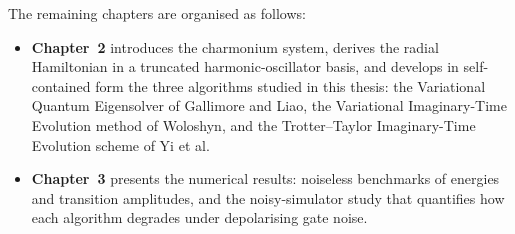 The remaining chapters are organised as follows:
\begin{itemize}
  \item \textbf{Chapter~2} introduces the charmonium system, derives the
    radial Hamiltonian in a truncated harmonic-oscillator basis, and
    develops in self-contained form the three algorithms studied in this
    thesis: the Variational Quantum Eigensolver of Gallimore and Liao,
    the Variational Imaginary-Time Evolution method of Woloshyn, and the
    Trotter--Taylor Imaginary-Time Evolution scheme of Yi et al.
  \item \textbf{Chapter~3} presents the numerical results: noiseless
    benchmarks of energies and transition amplitudes, and the
    noisy-simulator study that quantifies how each algorithm degrades
    under depolarising gate noise.
\end{itemize}

